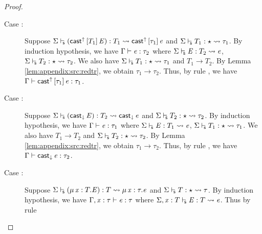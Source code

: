 \begin{proof}
\begin{description}
        \item[Case :] Suppose $ \Sigma  \vdash_{\!\!\mathsf{s} }  (  \mathsf{cast}^{\uparrow} \, [  T_{{\mathrm{1}}}  ] \,  \mathit{E}  )  :  T_{{\mathrm{1}}}   \rightsquigarrow   \mathsf{cast}^{\uparrow} \, [  \tau_{{\mathrm{1}}}  ] \,  \mathit{e} $ and $ \Sigma  \vdash_{\!\!\mathsf{s} }  T_{{\mathrm{1}}}  :  \star   \rightsquigarrow   \tau_{{\mathrm{1}}} $. By induction hypothesis, we
have $\Gamma  \vdash  \mathit{e}  :  \tau_{{\mathrm{2}}}$ where $ \Sigma  \vdash_{\!\!\mathsf{s} }  \mathit{E}  :  T_{{\mathrm{2}}}   \rightsquigarrow   \mathit{e} $, $ \Sigma  \vdash_{\!\!\mathsf{s} }  T_{{\mathrm{2}}}  :  \star   \rightsquigarrow   \tau_{{\mathrm{2}}} $. We also have $ \Sigma  \vdash_{\!\!\mathsf{s} }  T_{{\mathrm{1}}}  :  \star   \rightsquigarrow   \tau_{{\mathrm{1}}} $ and $T_{{\mathrm{1}}}  \longrightarrow  T_{{\mathrm{2}}}$. By Lemma
\ref{lem:appendix:src:redtr}, we obtain $\tau_{{\mathrm{1}}}  \longrightarrow  \tau_{{\mathrm{2}}}$. Thus, by rule
, we have $\Gamma  \vdash  \mathsf{cast}^{\uparrow} \, [  \tau_{{\mathrm{1}}}  ] \,  \mathit{e}  :  \tau_{{\mathrm{1}}}$.
        \item[Case :] Suppose $ \Sigma  \vdash_{\!\!\mathsf{s} }  (  \mathsf{cast}_{\downarrow} \, \mathit{E}  )  :  T_{{\mathrm{2}}}   \rightsquigarrow   \mathsf{cast}_{\downarrow} \, \mathit{e} $ and $ \Sigma  \vdash_{\!\!\mathsf{s} }  T_{{\mathrm{2}}}  :  \star   \rightsquigarrow   \tau_{{\mathrm{2}}} $. By induction hypothesis, we
have $\Gamma  \vdash  \mathit{e}  :  \tau_{{\mathrm{1}}}$ where $ \Sigma  \vdash_{\!\!\mathsf{s} }  \mathit{E}  :  T_{{\mathrm{1}}}   \rightsquigarrow   \mathit{e} $, $ \Sigma  \vdash_{\!\!\mathsf{s} }  T_{{\mathrm{1}}}  :  \star   \rightsquigarrow   \tau_{{\mathrm{1}}} $. We also have $T_{{\mathrm{1}}}  \longrightarrow  T_{{\mathrm{2}}}$ and $ \Sigma  \vdash_{\!\!\mathsf{s} }  T_{{\mathrm{2}}}  :  \star   \rightsquigarrow   \tau_{{\mathrm{2}}} $. By Lemma
\ref{lem:appendix:src:redtr}, we obtain $\tau_{{\mathrm{1}}}  \longrightarrow  \tau_{{\mathrm{2}}}$. Thus, by rule
, we have $\Gamma  \vdash  \mathsf{cast}_{\downarrow} \, \mathit{e}  :  \tau_{{\mathrm{2}}}$.
        \item[Case :] Suppose $ \Sigma  \vdash_{\!\!\mathsf{s} }  (  \mu \, \mathit{x}  :  T  .  \mathit{E}  )  :  T   \rightsquigarrow   \mu \, \mathit{x}  :  \tau  .  \mathit{e} $ and $ \Sigma  \vdash_{\!\!\mathsf{s} }  T  :  \star   \rightsquigarrow   \tau $. By induction hypothesis, we have $\Gamma  ,  \mathit{x}  :  \tau  \vdash  \mathit{e}  :  \tau$ where $ \Sigma  ,  \mathit{x}  :  T  \vdash_{\!\!\mathsf{s} }  \mathit{E}  :  T   \rightsquigarrow   \mathit{e} $. Thus by rule

\end{description}
\end{proof}
